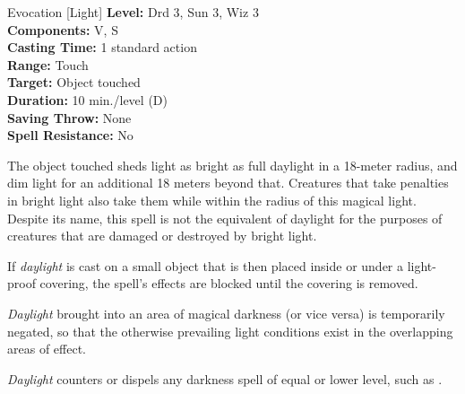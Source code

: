 {Evocation [Light]}
{
	\textbf{Level:}
	Drd 3, Sun 3, Wiz 3\\
	\textbf{Components:}
	V, S\\
	\textbf{Casting Time:}
	1 standard action\\
	\textbf{Range:}
	Touch\\
	\textbf{Target:}
	Object touched\\
	\textbf{Duration:}
	10 min./level (D)\\
	\textbf{Saving Throw:}
	None\\
	\textbf{Spell Resistance:}
	No\\
}
{
	The object touched sheds light as bright as full daylight in a 18-meter radius, and dim light for an additional 18 meters beyond that. Creatures that take penalties in bright light also take them while within the radius of this magical light. Despite its name, this spell is not the equivalent of daylight for the purposes of creatures that are damaged or destroyed by bright light.

	If \emph{daylight} is cast on a small object that is then placed inside or under a light-proof covering, the spell's effects are blocked until the covering is removed.

	\emph{Daylight} brought into an area of magical darkness (or vice versa) is temporarily negated, so that the otherwise prevailing light conditions exist in the overlapping areas of effect.

	\emph{Daylight} counters or dispels any darkness spell of equal or lower level, such as .

}
